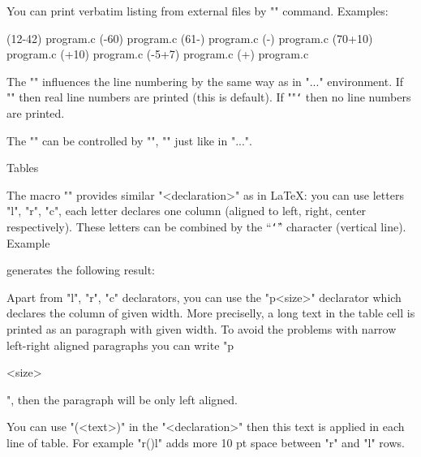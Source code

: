 You can print verbatim listing from external files by "\verbinput" command. 
Examples:

\begtt
\verbinput (12-42) program.c  %
\verbinput (-60) program.c    % print from begin to the line 60
\verbinput (61-) program.c    % from line 61 to the end
\verbinput (-) program.c      % whole file is printed
\verbinput (70+10) program.c  % from line 70, only 10 lines printed
\verbinput (+10) program.c    % from the last line read, print 10 lines 
\vebrinput (-5+7) program.c   %
\verbinput (+) program.c      % from the last line read to the end
\endtt


The "\ttline" influences the line numbering by the same way as in
"\begtt...\endtt" environment. If "" then real line numbers are
printed (this is default). If "\ttline"{\tt\char`} then no line 
numbers are printed. 

The "\verbinput" can be controlled by "\tthook", "\ttindent" just like
in "\begtt...\endtt".


\sec Tables

The macro "" provides similar "<declaration>"
as in \LaTeX: you can use letters "l", "r", "c", each letter declares 
one column (aligned to left, right, center respectively). 
These letters can be combined by the ``{\tt\char`\|}'' character 
(vertical line). Example

\begtt
{}
\endtt
%
generates the following result:

\bigskip
\hfil{}
\bigskip

Apart from "l", "r", "c" declarators, you can use the "p{<size>}" declarator
which declares the column of given width. More preciselly, a long text in
the table cell is printed as an paragraph with given width.
To avoid the problems with narrow left-right aligned paragraphs you can write
"p{<size>\raggedright}", then the paragraph will be only left aligned.

You can use "(<text>)" in the "<declaration>" then this text is applied in
each line of table. For example "r(\kern10pt)l" adds more 10 pt space
between "r" and "l" rows. 

